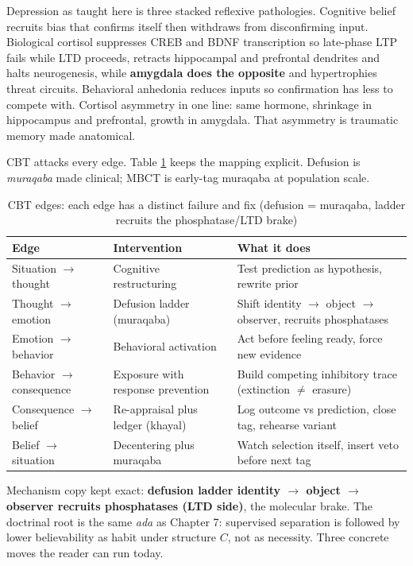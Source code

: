 Depression as taught here is three stacked reflexive pathologies. Cognitive belief recruits bias that confirms itself then withdraws from disconfirming input. Biological cortisol suppresses CREB and BDNF transcription so late-phase LTP fails while LTD proceeds, retracts hippocampal and prefrontal dendrites and halts neurogenesis, while \textbf{amygdala does the opposite} and hypertrophies threat circuits. Behavioral anhedonia reduces inputs so confirmation has less to compete with. Cortisol asymmetry in one line: same hormone, shrinkage in hippocampus and prefrontal, growth in amygdala. That asymmetry is traumatic memory made anatomical.

CBT attacks every edge. Table \ref{tab:cbt-edges} keeps the mapping explicit. Defusion is \textit{muraqaba} made clinical; MBCT is early-tag muraqaba at population scale.

\begin{table}[h]
\centering
\small
\caption{CBT edges: each edge has a distinct failure and fix (defusion = muraqaba, ladder recruits the phosphatase/LTD brake)}
\label{tab:cbt-edges}
\begin{tabular}{p{2.6cm}p{3.4cm}p{4.4cm}}
\toprule
Edge & Intervention & What it does \\
\midrule
Situation $\to$ thought & Cognitive restructuring & Test prediction as hypothesis, rewrite prior \\
Thought $\to$ emotion & Defusion ladder (muraqaba) & Shift identity $\to$ object $\to$ observer, recruits phosphatases \\
Emotion $\to$ behavior & Behavioral activation & Act before feeling ready, force new evidence \\
Behavior $\to$ consequence & Exposure with response prevention & Build competing inhibitory trace (extinction $\neq$ erasure) \\
Consequence $\to$ belief & Re-appraisal plus ledger (khayal) & Log outcome vs prediction, close tag, rehearse variant \\
Belief $\to$ situation & Decentering plus muraqaba & Watch selection itself, insert veto before next tag \\
\bottomrule
\end{tabular}
\end{table}

Mechanism copy kept exact: \textbf{defusion ladder identity $\to$ object $\to$ observer recruits phosphatases (LTD side)}, the molecular brake. The doctrinal root is the same \textit{ada} as Chapter 7: supervised separation is followed by lower believability as habit under structure $C$, not as necessity. Three concrete moves the reader can run today.

